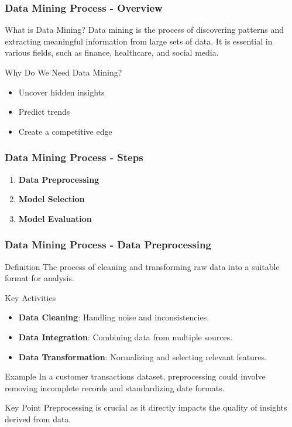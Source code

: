 \documentclass[aspectratio=169]{beamer}
\begin{document}
\begin{frame}[fragile]
    \frametitle{Data Mining Process - Overview}
    \begin{block}{What is Data Mining?}
        Data mining is the process of discovering patterns and extracting meaningful information from large sets of data. It is essential in various fields, such as finance, healthcare, and social media.
    \end{block}
    \begin{block}{Why Do We Need Data Mining?}
        \begin{itemize}
            \item Uncover hidden insights
            \item Predict trends
            \item Create a competitive edge
        \end{itemize}
    \end{block}
\end{frame}

\begin{frame}[fragile]
    \frametitle{Data Mining Process - Steps}
    \begin{enumerate}
        \item \textbf{Data Preprocessing}
        \item \textbf{Model Selection}
        \item \textbf{Model Evaluation}
    \end{enumerate}
\end{frame}

\begin{frame}[fragile]
    \frametitle{Data Mining Process - Data Preprocessing}
    \begin{block}{Definition}
        The process of cleaning and transforming raw data into a suitable format for analysis.
    \end{block}
    \begin{block}{Key Activities}
        \begin{itemize}
            \item \textbf{Data Cleaning}: Handling noise and inconsistencies.
            \item \textbf{Data Integration}: Combining data from multiple sources.
            \item \textbf{Data Transformation}: Normalizing and selecting relevant features.
        \end{itemize}
    \end{block}
    \begin{block}{Example}
        In a customer transactions dataset, preprocessing could involve removing incomplete records and standardizing date formats.
    \end{block}
    \begin{block}{Key Point}
        Preprocessing is crucial as it directly impacts the quality of insights derived from data.
    \end{block}
\end{frame}
\end{document}
